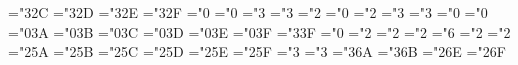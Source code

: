 { \def\hmUparrow{\delimiter"3\mthsy@@2A\mthex@@7E }%
 \def\hmDownarrow{\delimiter"3\mthsy@@2B\mthex@@7F }%
 \mathchardef\hmLeftrightarrow="3\mthsy@@2C
 \mathchardef\hmnwarrow="3\mthsy@@2D
 \mathchardef\hmswarrow="3\mthsy@@2E
 \mathchardef\hmpropto="3\mthsy@@2F
 \mathchardef\hmprime="0
 \mathchardef\hminfty="0
 \mathchardef\hmin="3
 \mathchardef\hmni="3 \let\hmowns=\hmni
 \mathchardef\hmbigtriangleup="2
 \mathchardef\hmtriangle="0
 \mathchardef\hmbigtriangledown="2
 \mathchardef\hmnot="3
 \mathchardef\hmmapstochar="3 
 \mathchardef\hmforall="0
 \mathchardef\hmexists="0
 \mathchardef\hmneg="0\mthsy@@3A \let\lnot=\neg
 \mathchardef\hmemptyset="0\mthsy@@3B
 \mathchardef\hmRe="0\mthsy@@3C
 \mathchardef\hmIm="0\mthsy@@3D
 \mathchardef\hmtop="0\mthsy@@3E
 \mathchardef\hmbot="0\mthsy@@3F
 \mathchardef\hmperp="3\mthsy@@3F
 \mathchardef\hmaleph="0
 \mathchardef\hmcomp="2
 \def\hmvec{\mathaccent"0\mthsy@@45 }%
 \mathchardef\hmtriangleright="2
 \mathchardef\hmtriangleleft="2
 \mathchardef\hmcolon="6
 \mathchardef\hmsetdif="2
 \mathchardef\hmcupprod="2
 \mathchardef\hmcapprod="2\mthsy@@5A
 \mathchardef\hmcup="2\mthsy@@5B
 \mathchardef\hmcap="2\mthsy@@5C
 \mathchardef\hmuplus="2\mthsy@@5D
 \mathchardef\hmwedge="2\mthsy@@5E \let\hmland=\hmwedge
 \mathchardef\hmvee="2\mthsy@@5F \let\hmlor=\hmvee
 \mathchardef\hmvdash="3
 \mathchardef\hmdashv="3
 \def\hmlfloor{\delimiter"4\mthsy@@62\mthex@@04 }%
 \def\hmrfloor{\delimiter"5\mthsy@@63\mthex@@05 }%
 \def\hmlceil{\delimiter"4\mthsy@@64\mthex@@06 }%
 \def\hmrceil{\delimiter"5\mthsy@@65\mthex@@07 }%
 \def\hmlbrace{\delimiter"4\mthsy@@66\mthex@@08 }%
 \def\hmrbrace{\delimiter"5\mthsy@@67\mthex@@09 }%
 \def\hmlangle{\delimiter"4\mthsy@@68\mthex@@0A }%
 \def\hmrangle{\delimiter"5\mthsy@@69\mthex@@0B }%
 \mathchardef\hmmid="3\mthsy@@6A
 \def\hmvert{\delimiter"\mthsy@@6A\mthex@@0C }%
 \mathchardef\hmparallel="3\mthsy@@6B
 \def\hmVert{\delimiter"\mthsy@@6B\mthex@@0D }%
 \def\hmupdownarrow{\delimiter"3\mthsy@@6C\mthex@@3F }%
 \def\hmUpdownarrow{\delimiter"3\mthsy@@6D\mthex@@77 }%
 \def\hmbackslash{\delimiter"\mthsy@@6E\mthex@@0F }%
 \def\hmarrowvert{\delimiter"\mthsy@@6A\mthex@@3C }%
 \def\hmArrowvert{\delimiter"\mthsy@@6\mthex@@3D }%
 \def\hmlgroup{\delimiter"4\mthsy@@2E\mthex@@3A }%
 \def\hmrgroup{\delimiter"5\mthsy@@2F\mthex@@3B }%
 \def\hmbracevert{\delimiter"\mthex@@8D\mthex@@8D }%
 \mathchardef\hmsetminus="2\mthsy@@6E 
 \mathchardef\hmwr="2\mthsy@@6F
}
